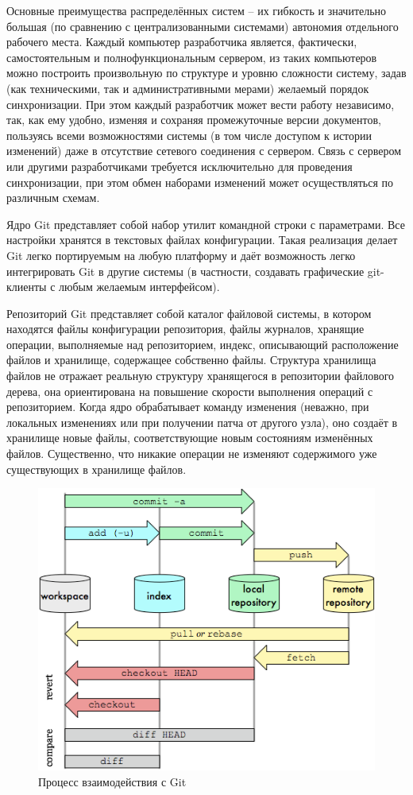 Основные преимущества распределённых систем -- их гибкость и значительно большая (по сравнению с
централизованными системами) автономия отдельного рабочего места. Каждый компьютер разработчика
является, фактически, самостоятельным и полнофункциональным сервером, из таких компьютеров можно
построить произвольную по структуре и уровню сложности систему, задав (как техническими, так и
административными мерами) желаемый порядок синхронизации. При этом каждый разработчик может вести
работу независимо, так, как ему удобно, изменяя и сохраняя промежуточные версии документов,
пользуясь всеми возможностями системы (в том числе доступом к истории изменений) даже в отсутствие
сетевого соединения с сервером. Связь с сервером или другими разработчиками требуется исключительно
для проведения синхронизации, при этом обмен наборами изменений может осуществляться по различным
схемам.

Ядро Git представляет собой набор утилит командной строки с параметрами. Все настройки хранятся в текстовых файлах конфигурации. Такая реализация делает Git легко портируемым на любую платформу и даёт возможность легко интегрировать Git в другие системы (в частности, создавать графические git-клиенты с любым желаемым интерфейсом).

Репозиторий Git представляет собой каталог файловой системы, в котором находятся файлы конфигурации репозитория, файлы журналов, хранящие операции, выполняемые над репозиторием, индекс, описывающий расположение файлов и хранилище, содержащее собственно файлы. Структура хранилища файлов не отражает реальную структуру хранящегося в репозитории файлового дерева, она ориентирована на повышение скорости выполнения операций с репозиторием. Когда ядро обрабатывает команду изменения (неважно, при локальных изменениях или при получении патча от другого узла), оно создаёт в хранилище новые файлы, соответствующие новым состояниям изменённых файлов. Существенно, что никакие операции не изменяют содержимого уже существующих в хранилище файлов.

\begin{figure}[h!]
    \centering
    \includegraphics[scale=0.7]{images/git-overview.png}
    \caption{Процесс взаимодействия с Git}
    \label{fig:git-overview}
\end{figure}

